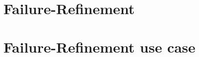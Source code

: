 


\section{Failure-Refinement}
\label{sec_failure-refinement}


\section{Failure-Refinement use case}
\label{sec_failure_refinement_application}
